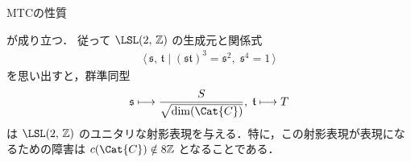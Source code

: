 \documentclass[TQFT_main]{subfiles}
\begin{document}
\begin{myprop}[label=prop:MTC]{MTCの性質}
\begin{enumerate}
        が成り立つ．
        従って $\LSL(2,\, \mathbb{Z})$ の生成元と関係式
        \begin{align}
            \langle\, \mathfrak{s},\, \mathfrak{t} \mid (\mathfrak{s}\mathfrak{t})^3 = \mathfrak{s}^2,\; \mathfrak{s}^4 = 1 \,\rangle
        \end{align}
        を思い出すと，群準同型
        \begin{align}
            \mathfrak{s} \lmto \frac{S}{\sqrt{\dim (\Cat{C})}},\; \mathfrak{t} \lmto T
        \end{align}
        は $\LSL(2,\, \mathbb{Z})$ のユニタリな射影表現を与える．特に，この射影表現が表現になるための障害は $c(\Cat{C}) \notin 8 \mathbb{Z}$ となることである．
    \end{enumerate}
    
\end{myprop}
\end{document}
